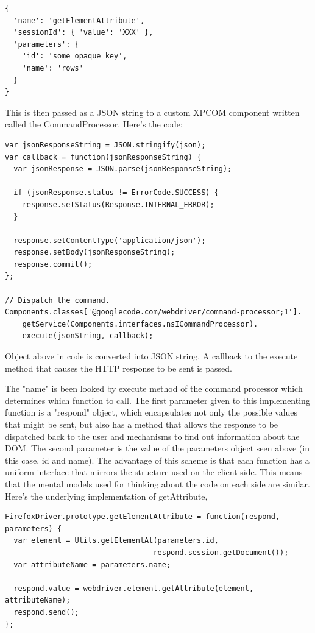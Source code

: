 \documentclass[article,type=msc,colorback,accentcolor=tud9c,twoside,11pt]{tudthesis}
\begin{document}
\begin{lstlisting}
{
  'name': 'getElementAttribute',
  'sessionId': { 'value': 'XXX' },
  'parameters': {
    'id': 'some_opaque_key',
    'name': 'rows'
  }
}
\end{lstlisting} 

This is then passed as a JSON string to a custom XPCOM component written called the CommandProcessor. Here's the code:
\begin{lstlisting}
var jsonResponseString = JSON.stringify(json);
var callback = function(jsonResponseString) {
  var jsonResponse = JSON.parse(jsonResponseString);

  if (jsonResponse.status != ErrorCode.SUCCESS) {
    response.setStatus(Response.INTERNAL_ERROR);
  }

  response.setContentType('application/json');
  response.setBody(jsonResponseString);
  response.commit();
};

// Dispatch the command.
Components.classes['@googlecode.com/webdriver/command-processor;1'].
    getService(Components.interfaces.nsICommandProcessor).
    execute(jsonString, callback);

\end{lstlisting}
Object above in code is converted into JSON string. A callback to the execute method that causes the HTTP response to be sent is passed.

 The "name" is been looked by execute method of the command processor which determines which function to call. The first parameter given to this implementing function is a "respond" object, which encapsulates not only the possible values that might be sent, but also has a method that allows the response to be dispatched back to the user and mechanisms to find out information about the DOM. The second parameter is the value of the parameters object seen above (in this case, id and name). The advantage of this scheme is that each function has a uniform interface that mirrors the structure used on the client side. This means that the mental models used for thinking about the code on each side are similar. Here's the underlying implementation of getAttribute,
 
 \begin{lstlisting}
FirefoxDriver.prototype.getElementAttribute = function(respond, parameters) {
  var element = Utils.getElementAt(parameters.id,
                                  respond.session.getDocument());
  var attributeName = parameters.name;

  respond.value = webdriver.element.getAttribute(element, attributeName);
  respond.send();
};
\end{lstlisting}
\end{document}
